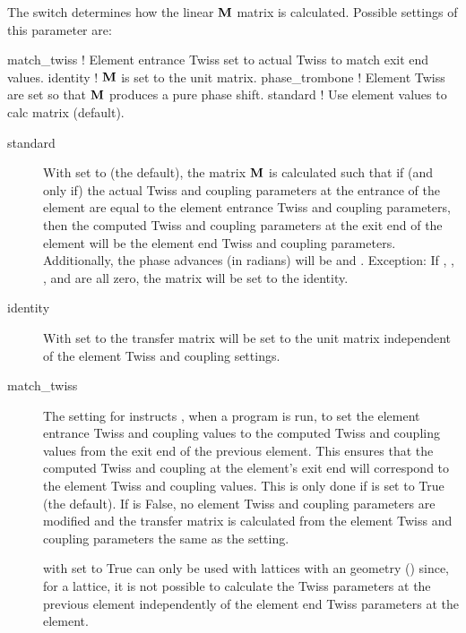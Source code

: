 {The  switch determines how the linear ${\bf M}$ matrix is calculated. Possible settings of this
parameter are:
\begin{example}
  match_twiss      ! Element entrance Twiss set to actual Twiss to match exit end values.
  identity         ! \({\bf M}\) is set to the unit matrix.
  phase_trombone   ! Element Twiss are set so that \({\bf M}\) produces a pure phase shift.
  standard         ! Use element values to calc matrix (default).
\end{example}
%
\begin{description} 
%
\item[standard] \Newline
With  set to  (the default), the matrix ${\bf M}$ is calculated such that if
(and only if) the actual Twiss and coupling parameters at the entrance of the  element
are equal to the element entrance Twiss and coupling parameters, then the computed Twiss and
coupling parameters at the exit end of the  element will be the element end Twiss and coupling
parameters. Additionally, the phase advances (in radians) will be  and . Exception:
If , , , and  are all zero, the matrix will be set to the
identity.
%
\item[identity] \Newline
With  set to  the transfer matrix will be set to the unit matrix independent
of the element Twiss and coupling settings.
%
\item[match_twiss] \Newline
The  setting for  instructs \bmad, when a program is run, to set the
element entrance Twiss and coupling values to the computed Twiss and coupling values from the exit
end of the previous element. This ensures that the computed Twiss and coupling at the element's exit end
will correspond to the element Twiss and coupling values. This is only done if  is set to
True (the default). If  is False, no element Twiss and coupling parameters are modified
and the transfer matrix is calculated from the element Twiss and coupling parameters the same as the
 setting.

 with  set to True can only be used with lattices with an 
geometry () since, for a  lattice, it is not possible to calculate the
Twiss parameters at the previous element independently of the element end Twiss parameters at the
 element.


\end{description}}
